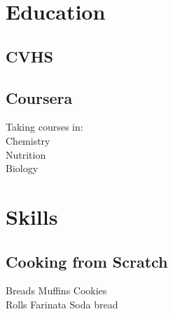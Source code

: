 \documentclass[]{resume-openfont}
\begin{document}
%
%
\lastupdated

%
%

%
%

\begin{minipage}[t]{0.33\textwidth} 


\section{Education} 

\subsection{CVHS}
\sectionsep

\subsection{Coursera}
Taking courses in:      \\
\textbullet{} Chemistry \\
\textbullet{} Nutrition \\
\textbullet{} Biology
\sectionsep


\section{Skills}
\subsection{Cooking from Scratch}
\textbullet{} Breads \textbullet{} Muffins \textbullet{} Cookies \\
\textbullet{} Rolls \textbullet{}Farinata \textbullet{} Soda bread



\end{minipage}
\end{document}
